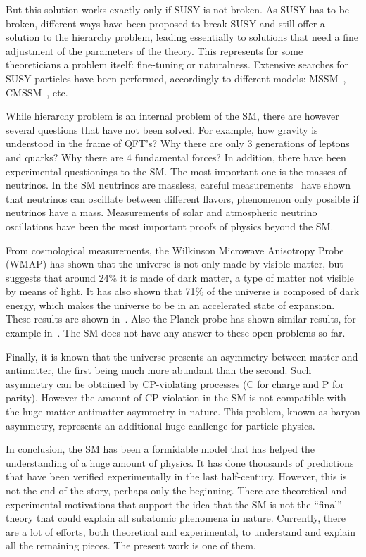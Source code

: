 But this solution works exactly only if SUSY is not broken. As SUSY has to be broken, different ways have been proposed to break SUSY and still offer a solution to the hierarchy problem, leading essentially to solutions that need a fine adjustment of the parameters of the theory. This represents for some theoreticians a problem itself: fine-tuning or naturalness. Extensive searches for SUSY particles have been performed, accordingly to different models: MSSM~\cite{Khachatryan:2014wca,Aad:2014vgg}, CMSSM~\cite{Agashe:2014kda}, etc.

While hierarchy problem is an internal problem of the SM, there are however several questions that have not been solved. For example, how gravity is understood in the frame of QFT's? Why there are only 3 generations of leptons and quarks? Why there are 4 fundamental forces? In addition, there have been experimental questionings to the SM. The most important one is the masses of neutrinos. In the SM neutrinos are massless, careful measurements~\cite{Ashie:2004mr, Weinheimer:2013hya} have shown that neutrinos can oscillate between different flavors, phenomenon only possible if neutrinos have a mass. Measurements of solar and atmospheric neutrino oscillations have been the most important proofs of physics beyond the SM. 

From cosmological measurements, the Wilkinson Microwave Anisotropy Probe (WMAP) has shown that the universe is not only made by visible matter, but suggests that around 24\% it is made of dark matter, a type of matter not visible by means of light. It has also shown that 71\% of the universe is composed of dark energy, which makes the universe to be in an accelerated state of expansion. These results are shown in~\cite{2013ApJS..208...20B, 2013ApJS..208...19H}. Also the Planck probe has shown similar results, for example in~\cite{Planck:2015xua}. The SM does not have any answer to these open problems so far. 

Finally, it is known that the universe presents an asymmetry between matter and antimatter, the first being much more abundant than the second. Such asymmetry can be obtained by CP-violating processes (C for charge and P for parity). However the amount of CP violation in the SM is not compatible with the huge matter-antimatter asymmetry in nature. This problem, known as baryon asymmetry, represents an additional huge challenge for particle physics. 

In conclusion, the SM has been a formidable model that has helped the understanding of a huge amount of physics. It has done thousands of predictions that have been verified experimentally in the last half-century. However, this is not the end of the story, perhaps only the beginning. There are theoretical and experimental motivations that support the idea that the SM is not the ``final'' theory that could explain all subatomic phenomena in nature. Currently, there are a lot of efforts, both theoretical and experimental, to understand and explain all the remaining pieces. The present work is one of them.

